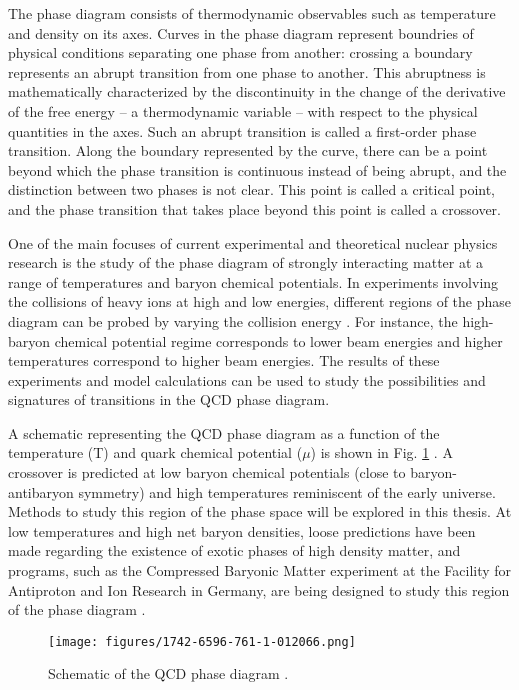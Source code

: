 The phase diagram consists of thermodynamic observables such as temperature and density on its axes. Curves in the phase diagram represent boundries of physical conditions separating one phase from another: crossing a boundary represents an abrupt transition from one phase to another. This abruptness is mathematically characterized by the discontinuity in the change of the derivative of the free energy -- a thermodynamic variable -- with respect to the physical quantities in the axes. Such an abrupt transition is called a first-order phase transition. Along the boundary represented by the curve, there can be a point beyond which the phase transition is continuous instead of being abrupt, and the distinction between two phases is not clear. This point is called a critical point, and the phase transition that takes place beyond this point is called a crossover.%

One of the main focuses of current experimental and theoretical nuclear physics research is the study of the phase diagram of strongly interacting matter at a range of temperatures and baryon chemical potentials. In experiments involving the collisions of heavy ions at high and low energies, different regions of the phase diagram can be probed by varying the collision energy \cite{PhysRevC.93.024901}. For instance, the high-baryon chemical potential regime corresponds to lower beam energies and higher temperatures correspond to higher beam energies. The results of these experiments and model calculations can be used to study the possibilities and signatures of transitions in the QCD phase diagram.

A schematic representing the QCD phase diagram as a function of the temperature (T) and quark chemical potential ($\mu$) is shown in Fig. \ref{fig:PhaseDiagram} \cite{1742-6596-761-1-012066}. A crossover is predicted at low baryon chemical potentials (close to baryon-antibaryon symmetry) and high temperatures reminiscent of the early universe. Methods to study this region of the phase space will be explored in this thesis. At low temperatures and high net baryon densities, loose predictions have been made regarding the existence of exotic phases of high density matter, and programs, such as the Compressed Baryonic Matter experiment at the Facility for Antiproton and Ion Research in Germany, are being designed to study this region of the phase diagram \cite{HEUSER2013941c}.
\begin{figure}[tb]
  \centering
  \texttt{[image: figures/1742-6596-761-1-012066.png]}\\
  \caption{Schematic of the QCD phase diagram \cite{1742-6596-761-1-012066}.}\label{fig:PhaseDiagram}
\end{figure}


